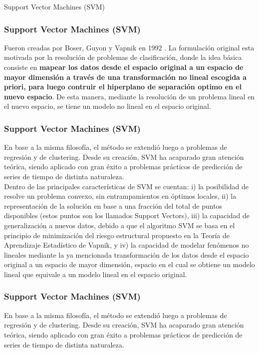 \documentclass[spanish,xcolor=table]{beamer}
\begin{document}
\begin{section}{Support Vector Machines (SVM)}
\begin{frame}
\frametitle{Support Vector Machines (SVM)}
Fueron creadas por Boser, Guyon y Vapnik en 1992 \cite{boser1992training}. La formulaci\'on original esta motivada por la resoluci\'on de problemas de clasificaci\'on, donde la idea b\'asica consiste en \textbf{mapear los datos desde el espacio original a un espacio de mayor dimensi\'on a trav\'es de una transformaci\'on no lineal escogida a priori, para luego contruir el hiperplano de separaci\'on optimo en el nuevo espacio}. De esta manera, mediante la resoluci\'on de un problema lineal en el nuevo espacio, se tiene un modelo no lineal en el espacio original. 
\end{frame}
\begin{frame}
\frametitle{Support Vector Machines (SVM)}
En base a la misma filosof\'{i}a, el m\'etodo se extendi\'o luego a problemas de regresi\'on y de clustering. Desde su creaci\'on, SVM ha acaparado gran atenci\'on te\'orica, siendo aplicado con gran \'exito a problemas pr\'acticos de predicci\'on de series de tiempo de distinta naturaleza. \\
Dentro de las principales caracter\'{i}sticas de SVM se cuentan: i) la posibilidad de resolve un problema convexo, sin entrampamientos en \'optimos locales, ii) la representaci\'on de la soluci\'on en base a una fracci\'on del total de puntos disponibles (estos puntos son los llamados Support Vectors), iii) la capacidad de generalizaci\'on a nuevos datos, debido a que el algoritmo SVM se basa en el principio de minimizaci\'on del riesgo estructural propuesto en la Teor\'{i}a de Aprendizaje Estad\'{i}stico de Vapnik, y iv) la capacidad de modelar fen\'omenos no lineales mediante la ya mencionada transformaci\'on de los datos desde el espacio original a un espacio de mayor dimensi\'on, espacio en el cual se obtiene un modelo lineal que equivale a un modelo lineal en el espacio original.
\end{frame}
\begin{frame}
\frametitle{Support Vector Machines (SVM)}
En base a la misma filosof\'{i}a, el m\'etodo se extendi\'o luego a problemas de regresi\'on y de clustering. Desde su creaci\'on, SVM ha acaparado gran atenci\'on te\'orica, siendo aplicado con gran \'exito a problemas pr\'acticos de predicci\'on de series de tiempo de distinta naturaleza. \\

\end{frame}
\end{section}
\end{document}
